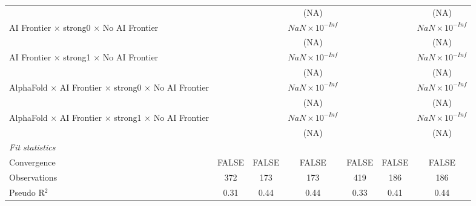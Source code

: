 \begin{tabular}{lcccccc}
                                                                              &                        &       & (NA)                   &                        &                        & (NA)\\   
   AI Frontier $\times$ strong0 $\times$ No AI Frontier                       &                        &       & $NaN\times 10^{-Inf}$  &                        &                        & $NaN\times 10^{-Inf}$\\    
                                                                              &                        &       & (NA)                   &                        &                        & (NA)\\   
   AI Frontier $\times$ strong1 $\times$ No AI Frontier                       &                        &       & $NaN\times 10^{-Inf}$  &                        &                        & $NaN\times 10^{-Inf}$\\    
                                                                              &                        &       & (NA)                   &                        &                        & (NA)\\   
   AlphaFold $\times$ AI Frontier $\times$ strong0 $\times$ No AI Frontier    &                        &       & $NaN\times 10^{-Inf}$  &                        &                        & $NaN\times 10^{-Inf}$\\    
                                                                              &                        &       & (NA)                   &                        &                        & (NA)\\   
   AlphaFold $\times$ AI Frontier $\times$ strong1 $\times$ No AI Frontier    &                        &       & $NaN\times 10^{-Inf}$  &                        &                        & $NaN\times 10^{-Inf}$\\    
                                                                              &                        &       & (NA)                   &                        &                        & (NA)\\   
   \midrule
   \emph{Fit statistics}\\
   Convergence                                                                &FALSE                   & FALSE & FALSE                  & FALSE                  & FALSE                  & FALSE\\  
   Observations                                                               & 372                    & 173   & 173                    & 419                    & 186                    & 186\\  
   Pseudo R$^2$                                                               & 0.31                   & 0.44  & 0.44                   & 0.33                   & 0.41                   & 0.44\\  
   

\end{tabular}
